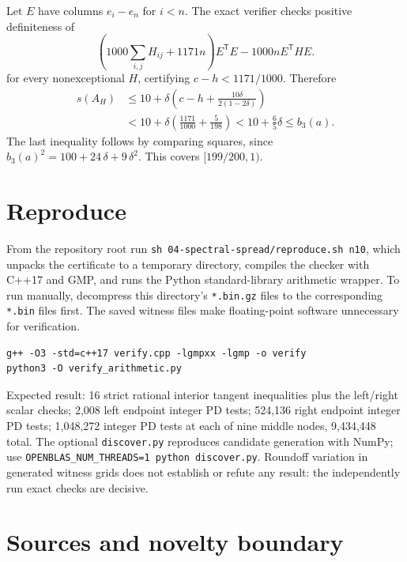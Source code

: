\documentclass[11pt]{article}
\begin{document}
Let \(E\) have columns \(e_i-e_n\) for \(i<n\). The exact verifier checks positive definiteness of
\[
\left(1000\sum_{i,j}H_{ij}+1171n\right)E^{\mathsf T}E-1000nE^{\mathsf T}HE.
\]
for every nonexceptional \(H\), certifying \(c-h<1171/1000\). Therefore
\[
\begin{aligned}s(A_H)&\le 10+\delta\left(c-h+\frac{10\delta}{2(1-2\delta)}\right)\\&<10+\delta\left(\frac{1171}{1000}+\frac5{198}\right)<10+\frac65\delta\le b_3(a).\end{aligned}
\]
The last inequality follows by comparing squares, since \(b_3(a)^2=100+24\,\delta +9\,\delta ^2\). This covers \([199/200,1)\).

\section{Reproduce}\label{reproduce}

From the repository root run \texttt{sh\ 04-spectral-spread/reproduce.sh\ n10}, which unpacks the certificate to a temporary directory, compiles the checker with C++17 and GMP, and runs the Python standard-library arithmetic wrapper. To run manually, decompress this directory's \texttt{*.bin.gz} files to the corresponding \texttt{*.bin} files first. The saved witness files make floating-point software unnecessary for verification.

\begin{verbatim}
g++ -O3 -std=c++17 verify.cpp -lgmpxx -lgmp -o verify
python3 -O verify_arithmetic.py
\end{verbatim}

Expected result: 16 strict rational interior tangent inequalities plus the left/right scalar checks; 2,008 left endpoint integer PD tests; 524,136 right endpoint integer PD tests; 1,048,272 integer PD tests at each of nine middle nodes, 9,434,448 total. The optional \texttt{discover.py} reproduces candidate generation with NumPy; use \texttt{OPENBLAS\_NUM\_THREADS=1\ python\ discover.py}. Roundoff variation in generated witness grids does not establish or refute any result: the independently run exact checks are decisive.

\section{Sources and novelty boundary}\label{sources-and-novelty-boundary}
\end{document}
